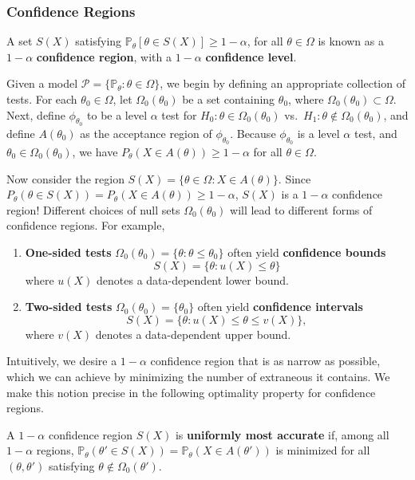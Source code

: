 \subsubsection{Confidence Regions}
\begin{defn}
A set $S(X)$ satisfying $\mathbb{P}_\theta[\theta \in S(X)] \ge 1 - \alpha$, for all 
$\theta \in \Omega$ is known as a $1 - \alpha$ \textbf{confidence region}, with a 
$1 - \alpha$ \textbf{confidence level}.
\end{defn}
Given a model $\mathcal{P} = \{\mathbb{P}_\theta : \theta \in \Omega\}$, we begin 
by defining an appropriate collection of tests. For each $\theta_0 \in \Omega$, let 
$\Omega_0(\theta_0)$ be a set containing $\theta_0$, where 
$\Omega_0(\theta_0) \subset \Omega$. Next, define $\phi_{\theta_0}$ to be a level 
$\alpha$ test for $H_0: \theta \in \Omega_0(\theta_0)$ vs.\ 
$H_1: \theta \notin \Omega_0(\theta_0)$, and define $A(\theta_0)$ as the acceptance 
region of $\phi_{\theta_0}$. Because $\phi_{\theta_0}$ is a level 
$\alpha$ test, and $\theta_0 \in \Omega_0(\theta_0)$, we have 
$P_\theta(X \in A(\theta)) \ge 1 - \alpha$ for all $\theta \in \Omega$.

Now consider the region $S(X) = \{\theta \in \Omega : X \in A(\theta)\}$. Since 
$P_\theta(\theta \in S(X)) = P_\theta(X \in A(\theta)) \ge 1 - \alpha$, $S(X)$ is a 
$1 - \alpha$ confidence region! Different choices of null sets $\Omega_0(\theta_0)$ 
will lead to different forms of confidence regions. For example,
\begin{enumerate}
  \item \textbf{One-sided tests} $\Omega_0(\theta_0) = \{\theta : \theta \le \theta_0\}$ 
  often yield \textbf{confidence bounds}
  \[
    S(X) = \{\theta : u(X) \le \theta\}
  \]
  where $u(X)$ denotes a data-dependent lower bound.
  \item \textbf{Two-sided tests} $\Omega_0(\theta_0) = \{\theta_0\}$ often yield 
  \textbf{confidence intervals}
  \[
    S(X) = \{\theta : u(X) \le \theta \le v(X)\},
  \]
  where $v(X)$ denotes a data-dependent upper bound.
\end{enumerate}

Intuitively, we desire a $1 - \alpha$ confidence region that is as narrow as 
possible, which we can achieve by minimizing the number of extraneous it contains. 
We make this notion precise in the following optimality property for confidence 
regions.

\begin{defn}[UMA]
A $1 - \alpha$ confidence region $S(X)$ is \textbf{uniformly most accurate} if, 
among all $1 - \alpha$ regions, $\mathbb{P}_\theta(\theta' \in S(X)) 
= \mathbb{P}_\theta(X \in A(\theta'))$ is minimized for all $(\theta, \theta')$ 
satisfying $\theta \notin \Omega_0(\theta')$.
\end{defn}

